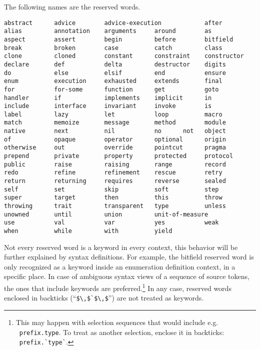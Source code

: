 The following names are the reserved words.

\begin{lstlisting}
abstract      advice        advice-execution            after
alias         annotation    arguments     around        as
aspect        assert        begin         before        bitfield
break         broken        case          catch         class
clone         cloned        constant      constraint    constructor
declare       def           delta         destructor    digits
do            else          elsif         end           ensure
enum          execution     exhausted     extends       final
for           for-some      function      get           goto
handler       if            implements    implicit      in
include       interface     invariant     invoke        is
label         lazy          let           loop          macro
match         memoize       message       method        module
native        next          nil           no      not   object
of            opaque        operator      optional      origin
otherwise     out           override      pointcut      pragma
prepend       private       property      protected     protocol
public        raise         raising       range         record
redo          refine        refinement    rescue        retry
return        returning     requires      reverse       sealed
self          set           skip          soft          step
super         target        then          this          throw
throwing      trait         transparent   type          unless
unowned       until         union         unit-of-measure
use           val           var           yes           weak
when          while         with          yield
\end{lstlisting}

Not every reserved word is a keyword in every context, this behavior will be further explained by syntax definitions. For example, the bitfield reserved word is only recognized as a keyword inside an enumeration definition context, in a specific place. In case of ambiguous syntax views of a sequence of source tokens, the ones that include keywords are preferred.\footnote{This may happen with selection sequences that would include e.g. ~\lstinline!prefix.type!. To treat  as another selection, enclose it in backticks: ~\lstinline[deletekeywords={type}]!prefix.`type`!.} In any case, reserved words enclosed in backticks (``\lstinline!$\,$`$\,$!'') are not treated as keywords. 






